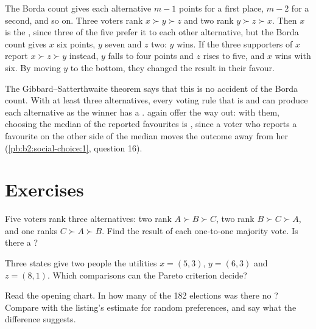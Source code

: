 The Borda count gives each alternative $m - 1$ points for a first place, $m - 2$ for a second, and so on.
Three voters rank $x \succ y \succ z$ and two rank $y \succ z \succ x$. Then $x$ is the , since three
of the five prefer it to each other alternative, but the Borda count gives $x$ six points, $y$ seven and $z$ two:
$y$ wins. If the three supporters of $x$ report $x \succ z \succ y$ instead, $y$ falls to four points and $z$ rises to
five, and $x$ wins with six. By moving $y$ to the bottom, they changed the result in their favour.

The Gibbard--Satterthwaite theorem says that this is no accident of the Borda count. With at least three
alternatives, every voting rule that is  and can produce each alternative as the winner
has a .  again offer the way out: with them, choosing the median of
the reported favourites is , since a voter who reports a favourite on the other side of the
median moves the outcome away from her (\cref{pb:b2:social-choice:1}, question 16).

\section{Exercises}\label{sec:b2:social-choice:exercises}

\begin{exercise}[$\star$]\label{exo:b2:social-choice:1}
Five voters rank three alternatives: two rank $A \succ B \succ C$, two rank $B \succ C \succ A$, and one ranks
$C \succ A \succ B$. Find the result of each one-to-one majority vote. Is there a ?
\end{exercise}

\begin{exercise}[$\star$]\label{exo:b2:social-choice:2}
Three states give two people the utilities $x = (5, 3)$, $y = (6, 3)$ and $z = (8, 1)$. Which comparisons can
the Pareto criterion decide?
\end{exercise}

\begin{exercise}[$\star$]\label{exo:b2:social-choice:3}
Read the opening chart. In how many of the 182 elections was there no ? Compare with the
listing's estimate for random preferences, and say what the difference suggests.
\end{exercise}

